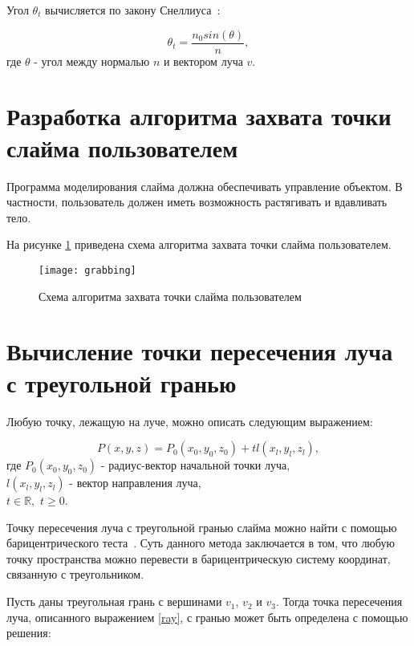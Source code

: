Угол $\theta_t$ вычисляется по закону Снеллиуса~\cite{raytracingen}:

\begin{equation}\label{snell}
	\theta_t = \frac{n_0sin(\theta)}{n},
\end{equation}
где $\theta$ - угол между нормалью $n$ и вектором луча $v$.

\section{Разработка алгоритма захвата точки слайма пользователем}

Программа моделирования слайма должна обеспечивать управление объектом. В частности, пользователь должен иметь возможность растягивать и вдавливать тело.

На рисунке \ref{grabbing} приведена схема алгоритма захвата точки слайма пользователем.

\begin{figure}[H]
	\centering
	\texttt{[image: grabbing]}
	\caption{Схема алгоритма захвата точки слайма пользователем}
	\label{grabbing}
\end{figure}

\section{Вычисление точки пересечения луча с треугольной гранью}

Любую точку, лежащую на луче, можно описать следующим выражением:

\begin{equation}\label{ray}
	P(x, y, z) = P_0(x_0, y_0, z_0) + tl(x_l, y_l, z_l),
\end{equation}
где $P_0(x_0, y_0, z_0)$ - радиус-вектор начальной точки луча,\\
\text{~~~~~~}$l(x_l, y_l, z_l)$ - вектор направления луча,\\
\text{~~~~~~}$t \in \mathbb{R},$ $t \ge 0$.

Точку пересечения луча с треугольной гранью слайма можно найти с помощью барицентрического теста~\cite{intersection}. Суть данного метода заключается в том, что любую точку пространства можно перевести в барицентрическую систему координат, связанную с треугольником.

Пусть даны треугольная грань с вершинами $v_1$, $v_2$ и $v_3$. Тогда точка пересечения луча, описанного выражением \eqref{ray}, с гранью может быть определена с помощью решения:

